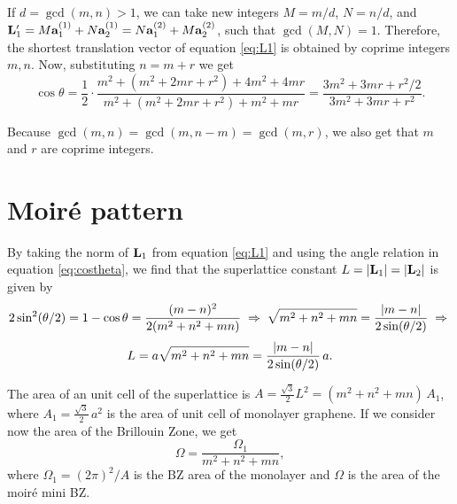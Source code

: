 \documentclass[a4paper,12pt]{report}
\begin{document}
If $d = \gcd(m, n) > 1$, we can take new integers $M = m/d$, $N = n/d$, and $\vb{L}_1' = M\vb{a}_1^{(1)} + N\vb{a}_2^{(1)} = N\vb{a}_1^{(2)} + M\vb{a}_2^{(2)}$, such that $\gcd(M, N) = 1$. Therefore, the shortest translation vector of equation \ref{eq:L1} is obtained by coprime integers $m, n$. Now, substituting $n = m + r$ we get
\begin{equation} \label{eq:costheta-r}
\boxed{\cos\theta = \frac{1}{2} \cdot \frac{m^2 + (m^2 + 2mr + r^2) + 4m^2 + 4mr}{m^2 + (m^2 + 2mr + r^2) + m^2 + mr} =
\frac{3 m^2 + 3mr + r^2/2}{3m^2 + 3mr + r^2}. }
\end{equation}

Because $\gcd(m, n) = \gcd(m, n-m) = \gcd(m, r)$, we also get that $m$ and $r$ are coprime integers.

\n



\pagebreak

\section{Moiré pattern}

By taking the norm of $\vb{L}_1$ from equation \ref{eq:L1} and using the angle relation in equation \ref{eq:costheta}, we find that the superlattice constant $L = \abs{\vb{L}_1} = \abs{\vb{L}_2}$ is given by
$$
2\sin[2](\theta/2) = 1 - \cos\theta = \frac{(m-n)^2}{2(m^2+n^2+mn)} \; \Rightarrow \;
\sqrt{m^2+n^2+mn} = \frac{\abs{m-n}}{2\sin(\theta/2)} \; \Rightarrow \;
$$
\begin{equation} \label{eq:L-commensurate}
L = a\sqrt{m^2 + n^2 + mn} = \frac{\abs{m-n}}{2 \sin(\theta/2)} \, a.
\end{equation}

\n


The area of an unit cell of the superlattice is $A = \frac{\sqrt{3}}{2} L^2 = (m^2 + n^2 + mn) \, A_1$, where $A_1 = \frac{\sqrt{3}}{2} \, a^2$ is the area of unit cell of monolayer graphene. If we consider now the area of the Brillouin Zone, we get
\begin{equation} \label{eq:bz-volume}
\Omega = \frac{\Omega_1}{m^2 + n^2 + mn},
\end{equation}
where $\Omega_1 = (2\pi)^2/A$ is the BZ area of the monolayer and $\Omega$ is the area of the moiré mini BZ.
\end{document}
